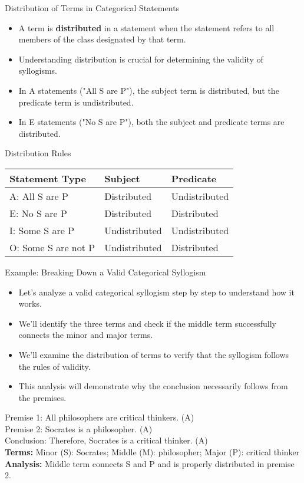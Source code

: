 \documentclass{beamer}
\begin{document}
	\begin{frame}{Distribution of Terms in Categorical Statements}
		\begin{itemize}
			\item A term is \textbf{distributed} in a statement when the statement refers to all members of the class designated by that term.
			\item Understanding distribution is crucial for determining the validity of syllogisms.
			\item In A statements ("All S are P"), the subject term is distributed, but the predicate term is undistributed.
			\item In E statements ("No S are P"), both the subject and predicate terms are distributed.
		\end{itemize}
		
		\begin{block}{Distribution Rules}
			\begin{tabular}{|l|l|l|}
				\hline
				\textbf{Statement Type} & \textbf{Subject} & \textbf{Predicate} \\
				\hline
				A: All S are P & Distributed & Undistributed \\
				E: No S are P & Distributed & Distributed \\
				I: Some S are P & Undistributed & Undistributed \\
				O: Some S are not P & Undistributed & Distributed \\
				\hline
			\end{tabular}
		\end{block}
	\end{frame}
	
	\begin{frame}{Example: Breaking Down a Valid Categorical Syllogism}
		\begin{itemize}
			\item Let's analyze a valid categorical syllogism step by step to understand how it works.
			\item We'll identify the three terms and check if the middle term successfully connects the minor and major terms.
			\item We'll examine the distribution of terms to verify that the syllogism follows the rules of validity.
			\item This analysis will demonstrate why the conclusion necessarily follows from the premises.
		\end{itemize}
		
		\begin{example}
			\scriptsize
			Premise 1: All philosophers are critical thinkers. (A)\\
			Premise 2: Socrates is a philosopher. (A)\\
			Conclusion: Therefore, Socrates is a critical thinker. (A)\\
			
			\textbf{Terms:} Minor (S): Socrates; Middle (M): philosopher; Major (P): critical thinker\\
			\textbf{Analysis:} Middle term connects S and P and is properly distributed in premise 2.
		\end{example}
	\end{frame}
	
\end{document}
